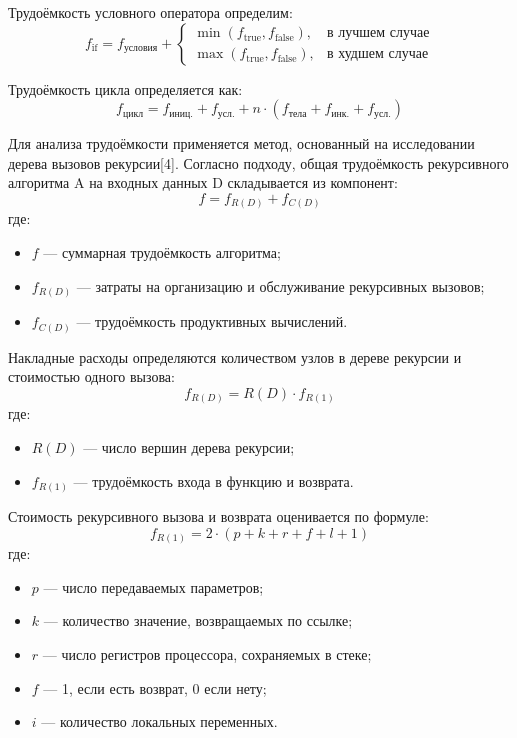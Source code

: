 Трудоёмкость условного оператора определим:
\begin{equation}
	f_{\text{if}} = f_{\text{условия}} +
	\begin{cases}
		\min(f_{\text{true}}, f_{\text{false}}), & \text{в лучшем случае} \\
		\max(f_{\text{true}}, f_{\text{false}}), & \text{в худшем случае}
	\end{cases}
\end{equation}

Трудоёмкость цикла определяется как:
\begin{equation}
	f_{\text{цикл}} = f_{\text{иниц.}} + f_{\text{усл.}} + n \cdot (f_{\text{тела}} + f_{\text{инк.}} + f_{\text{усл.}})
\end{equation}

Для анализа трудоёмкости применяется метод, основанный на исследовании дерева вызовов рекурсии[4]. Согласно подходу, общая трудоёмкость рекурсивного алгоритма A на входных данных D складывается из компонент:
\begin{equation}
	f = f_{R(D)} + f_{C(D)}
		\label{eq:2.3}
\end{equation}
где:
\begin{itemize}\item $f$ — суммарная трудоёмкость алгоритма;
	\item $f_{R(D)}$ — затраты на организацию и обслуживание рекурсивных вызовов;
	\item $f_{C(D)}$ — трудоёмкость продуктивных вычислений.
 \end{itemize}

Накладные расходы определяются количеством узлов в дереве рекурсии и стоимостью одного вызова:
\begin{equation}
	f_{R(D)} = R(D) \cdot f_{R(1)}
	\label{eq:2.4}
\end{equation}
где:
\begin{itemize}
	\item $R(D)$ — число вершин дерева рекурсии;
	\item $f_{R(1)}$ — трудоёмкость входа в функцию и возврата.
\end{itemize}

Стоимость рекурсивного вызова и возврата оценивается по формуле:
\begin{equation}
	f_{R(1)} = 2 \cdot (p + k + r + f + l + 1)
	\label{eq:2.5}
\end{equation}
где:
\begin{itemize}
	\item $p$ — число передаваемых параметров;
	\item $k$ — количество значение, возвращаемых по ссылке;
	\item $r$ — число регистров процессора, сохраняемых в стеке;
	\item $f$ — 1, если есть возврат, 0 если нету;
	\item $i$ — количество локальных переменных.
\end{itemize}


